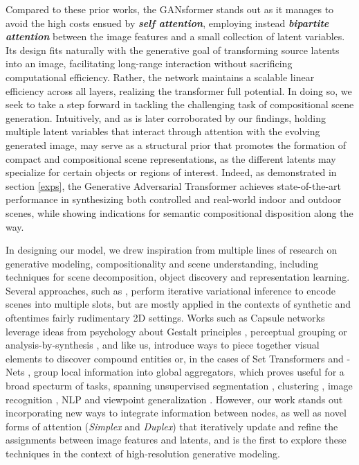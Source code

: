 \documentclass{article}
\begin{document}
Compared to these prior works, the GANsformer stands out as it manages to avoid the high costs ensued by \textbf{\textit{self attention}}, employing instead \textbf{\textit{bipartite attention}} between the image features and a small collection of latent variables. Its design fits naturally with the generative goal of transforming source latents into an image, facilitating long-range interaction without sacrificing computational efficiency. Rather, the network maintains a scalable linear efficiency across all layers, realizing the transformer full potential. In doing so, we seek to take a step forward in tackling the challenging task of compositional scene generation. Intuitively, and as is later corroborated by our findings, holding multiple latent variables that interact through attention with the evolving generated image, may serve as a structural prior that promotes the formation of compact and compositional scene representations, as the different latents may specialize for certain objects or regions of interest. Indeed, as demonstrated in section \ref{exps}, the Generative Adversarial Transformer achieves state-of-the-art performance in synthesizing both controlled and real-world indoor and outdoor scenes, while showing indications for semantic compositional disposition along the way. 


In designing our model, we drew inspiration from multiple lines of research on generative modeling, compositionality and scene understanding, including techniques for scene decomposition, object discovery and representation learning. Several approaches, such as \citep{monet,iodine,air,genesis}, perform iterative variational inference to encode scenes into multiple slots, but are mostly applied in the contexts of synthetic and oftentimes fairly rudimentary 2D settings. Works such as Capsule networks  \citep{capsules1} leverage ideas from psychology about Gestalt principles \citep{gestalt1,gestalt2}, perceptual grouping \citep{gestalt3} or analysis-by-synthesis \cite{rbc1}, and like us, introduce ways to piece together visual elements to discover compound entities or, in the cases of Set Transformers \citep{settrns} and -Nets \citep{doubleatt}, group local information into global aggregators, which proves useful for a broad specturm of tasks, spanning unsupervised segmentation \citep{nem,slotatt}, clustering \citep{settrns}, image recognition \citep{doubleatt}, NLP \citep{etc} and viewpoint generalization \citep{capsules3}. However, our work stands out incorporating new ways to integrate information between nodes, as well as novel forms of attention (\textit{Simplex} and \textit{Duplex}) that iteratively update and refine the assignments between image features and latents, and is the first to explore these techniques in the context of high-resolution generative modeling.
\end{document}
